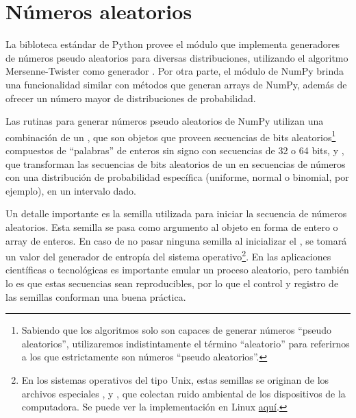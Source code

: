 \section{Números aleatorios}

La bibloteca estándar de Python provee el módulo  que implementa generadores de números pseudo aleatorios para diversas distribuciones, utilizando el algoritmo Mersenne-Twister como generador \cite{matsumoto1998}. Por otra parte, el módulo  de NumPy brinda una funcionalidad similar con métodos que generan arrays de NumPy, además de ofrecer un número mayor de distribuciones de probabilidad.

Las rutinas para generar números pseudo aleatorios de NumPy utilizan una combinación de un , que son objetos que proveen secuencias de bits aleatorios\footnote{Sabiendo que los algoritmos solo son capaces de generar números ``pseudo aleatorios'', utilizaremos indistintamente el término ``aleatorio'' para referirnos a los que estrictamente son números ``pseudo aleatorios''.} compuestos de ``palabras'' de enteros sin signo con secuencias de 32 o 64 bits, y , que transforman las secuencias de bits aleatorios de un  en secuencias de números con una distribución de probabilidad específica (uniforme, normal o binomial, por ejemplo), en un intervalo dado.

Un detalle importante es la semilla utilizada para iniciar la secuencia de números aleatorios. Esta semilla se pasa como argumento al objeto  en forma de entero o array de enteros. En caso de no pasar ninguna semilla al inicializar el , se tomará un valor del generador de entropía del sistema operativo\footnote{En los sistemas operativos del tipo Unix, estas semillas se originan de los archivos especiales ,  y , que colectan ruido ambiental de los dispositivos de la computadora. Se puede ver la implementación en Linux \href{https://git.kernel.org/pub/scm/linux/kernel/git/stable/linux.git/tree/drivers/char/random.c?id=refs/tags/v3.15.6\#n52}{aquí}.}. En las aplicaciones científicas o tecnológicas es importante emular un proceso aleatorio, pero también lo es que estas secuencias sean reproducibles, por lo que el control y registro de las semillas conforman una buena práctica.

